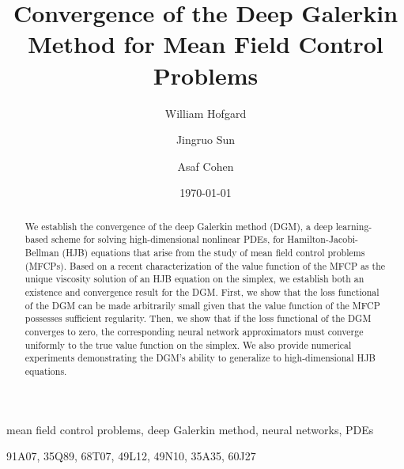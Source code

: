 \documentclass[11pt,reqno]{amsart}
\title{Convergence of the Deep Galerkin Method for Mean Field Control Problems}
\author{William Hofgard}
\author{Jingruo Sun}
\author{Asaf Cohen}
\date{\today}
\numberwithin{equation}{section}
\theoremstyle{plain}
\begin{document}
\maketitle
\begin{abstract}
We establish the convergence of the deep Galerkin method (DGM), a deep learning-based scheme for solving high-dimensional nonlinear PDEs, for Hamilton-Jacobi-Bellman (HJB) equations that arise from the study of mean field control problems (MFCPs). Based on a recent characterization of the value function of the MFCP as the unique viscosity solution of an HJB equation on the simplex, we establish both an existence and convergence result for the DGM. First, we show that the loss functional of the DGM can be made arbitrarily small given that the value function of the MFCP possesses sufficient regularity. Then, we show that if the loss functional of the DGM converges to zero, the corresponding neural network approximators must converge uniformly to the true value function on the simplex. We also provide numerical experiments demonstrating the DGM's ability to generalize to high-dimensional HJB equations.
\end{abstract}
 mean field control problems, deep Galerkin method, neural networks, PDEs 

91A07,  	%
35Q89,  	%
68T07,  	%
49L12,  	%
49N10, 	%
35A35,  	%
60J27 %

\tableofcontents
\end{document}
